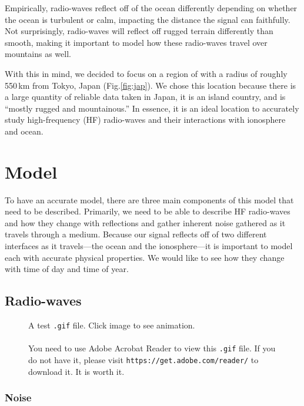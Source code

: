 \documentclass[11pt]{article}
\numberwithin{equation}{section}
\begin{document}
Empirically, radio-waves reflect off of the ocean differently depending on whether the ocean is turbulent or calm, impacting the distance the signal can faithfully.\cite{mcm_statement} Not surprisingly, radio-waves will reflect off rugged terrain differently than smooth, making it important to model how these radio-waves travel over mountains as well.

With this in mind, we decided to focus on a region of with a radius of roughly 550\,\si{\km} from Tokyo, Japan (Fig.\ref{fig:jap}). We chose this location because there is a large quantity of reliable data taken in Japan, it is an island country, and is ``mostly rugged and mountainous.''\cite{factbook2010world} In essence, it is an ideal location to accurately study high-frequency (HF) radio-waves and their interactions with ionosphere and ocean.


\section{Model} %
\label{sec:model}

To have an accurate model, there are three main components of this model that need to be described. Primarily, we need to be able to describe HF radio-waves and how they change with reflections and gather inherent noise gathered as it travels through a medium. Because our signal reflects off of two different interfaces as it travels---the ocean and the ionosphere---it is important to model each with accurate physical properties. We would like to see how they change with time of day and time of year. 
\subsection{Radio-waves} %
\label{sub:radiowaves}

 \begin{figure}
     \begin{center}
     \end{center}
     \caption{A test \texttt{.gif} file. Click image to see animation. \\\\You need to use Adobe Acrobat Reader to view this \texttt{.gif} file. If you do not have it, please visit \texttt{https://get.adobe.com/reader/} to download it. It is worth it.}
 \end{figure}

\subsubsection{Noise} %
\label{ssub:noise}
\end{document}
